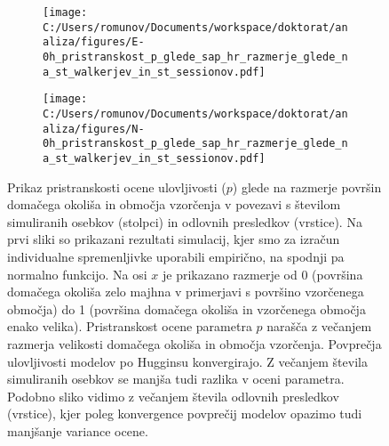 \begin{figure}[H]
\centering
\begin{subfigure}[b]{1\textwidth}
  \centering
  \texttt{[image: C:/Users/romunov/Documents/workspace/doktorat/analiza/figures/E-0h\_pristranskost\_p\_glede\_sap\_hr\_razmerje\_glede\_na\_st\_walkerjev\_in\_st\_sessionov.pdf]}
  \label{sli:sub6.1}
\end{subfigure}

\begin{subfigure}[b]{1\textwidth}
  \centering
  \texttt{[image: C:/Users/romunov/Documents/workspace/doktorat/analiza/figures/N-0h\_pristranskost\_p\_glede\_sap\_hr\_razmerje\_glede\_na\_st\_walkerjev\_in\_st\_sessionov.pdf]}
  \label{sli:sub6.2}
\end{subfigure}
\caption[Prikaz pristranskosti ocene ulovljivosti ($p$) glede na razmerje površin domačega okoliša in območja vzorčenja v povezavi s številom simuliranih osebkov (stolpci) in odlovnih presledkov (vrstice).]{Prikaz pristranskosti ocene ulovljivosti ($p$) glede na razmerje površin domačega okoliša in območja vzorčenja v povezavi s številom simuliranih osebkov (stolpci) in odlovnih presledkov (vrstice). Na prvi sliki so prikazani rezultati simulacij, kjer smo za izračun individualne spremenljivke uporabili empirično, na spodnji pa normalno funkcijo. Na osi $x$ je prikazano razmerje od 0 (površina domačega okoliša zelo majhna v primerjavi s površino vzorčenega območja) do 1 (površina domačega okoliša in vzorčenega območja enako velika). Pristranskost ocene parametra $p$ narašča z večanjem razmerja velikosti domačega okoliša in območja vzorčenja. Povprečja ulovljivosti modelov po Hugginsu konvergirajo. Z večanjem števila simuliranih osebkov se manjša tudi razlika v oceni parametra. Podobno sliko vidimo z večanjem števila odlovnih presledkov (vrstice), kjer poleg konvergence povprečij modelov opazimo tudi manjšanje variance ocene.}
\label{sli:slika6}
\end{figure}

